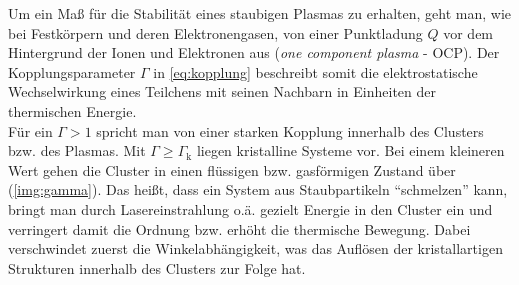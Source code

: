 \documentclass[numbers=noenddot,a4paper,notitlepage,twoside,BCOR15mm]{scrartcl}
\newcommand{\ix}[1]{_\text{#1}}
\newcommand{\tilt}[1]{\textit{#1}}
\begin{document}
		Um ein Maß für die Stabilität eines staubigen Plasmas zu erhalten, geht man, wie bei Festkörpern und deren Elektronengasen, von einer Punktladung $Q$ vor dem Hintergrund der Ionen und Elektronen aus (\tilt{one component plasma} - OCP). Der Kopplungsparameter $\Gamma$ in \autoref{eq:kopplung} beschreibt somit die elektrostatische Wechselwirkung eines Teilchens mit seinen Nachbarn in Einheiten der thermischen Energie.\\
		Für ein $\Gamma>1$ spricht man von einer starken Kopplung innerhalb des Clusters bzw. des Plasmas. Mit $\Gamma\geq\Gamma\ix{k}$ liegen kristalline Systeme vor. Bei einem kleineren Wert gehen die Cluster in einen flüssigen bzw. gasförmigen Zustand über (\autoref{img:gamma}). Das heißt, dass ein System aus Staubpartikeln "`schmelzen"' kann, bringt man durch Lasereinstrahlung o.ä. gezielt Energie in den Cluster ein und verringert damit die Ordnung bzw. erhöht die thermische Bewegung. Dabei verschwindet zuerst die Winkelabhängigkeit, was das Auflösen der kristallartigen Strukturen innerhalb des Clusters zur Folge hat.

	\clearpage
\end{document}
